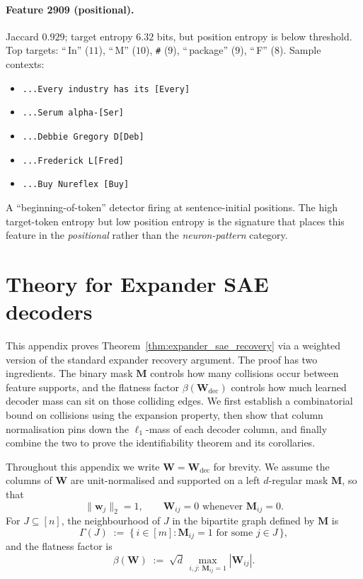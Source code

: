 \documentclass{article}
\theoremstyle{plain}
\theoremstyle{definition}
\theoremstyle{remark}
\begin{document}
\paragraph{Feature 2909 (positional).}
Jaccard $0.929$; target entropy $6.32$ bits, but position entropy is below threshold.
%
Top targets: ``\,In'' ($11$), ``\,M'' ($10$), \texttt{\#} ($9$), ``\,package'' ($9$), ``\,F'' ($8$).
%
Sample contexts:
\begin{itemize}
    \item \texttt{...Every industry has its [Every]}
    \item \texttt{...Serum alpha-[Ser]}
    \item \texttt{...Debbie Gregory D[Deb]}
    \item \texttt{...Frederick L[Fred]}
    \item \texttt{...Buy Nureflex [Buy]}
\end{itemize}
A ``beginning-of-token'' detector firing at sentence-initial positions.
%
The high target-token entropy but low position entropy is the signature that places this feature in the \emph{positional} rather than the \emph{neuron-pattern} category.






\section{Theory for Expander SAE decoders}
\label{app:expander_sae_theory}

This appendix proves Theorem~\ref{thm:expander_sae_recovery} via a weighted version of the standard expander recovery argument. The proof has two ingredients. The binary mask $\mathbf{M}$ controls how many collisions occur between feature supports, and the flatness factor $\beta(\mathbf{W}_{\mathrm{dec}})$ controls how much learned decoder mass can sit on those colliding edges. We first establish a combinatorial bound on collisions using the expansion property, then show that column normalisation pins down the $\ell_1$-mass of each decoder column, and finally combine the two to prove the identifiability theorem and its corollaries.

Throughout this appendix we write $\mathbf{W} = \mathbf{W}_{\mathrm{dec}}$ for brevity. We assume the columns of $\mathbf{W}$ are unit-normalised and supported on a left $d$-regular mask $\mathbf{M}$, so that
\[
    \|\mathbf{w}_j\|_2 = 1,
    \qquad
    \mathbf{W}_{ij} = 0 \text{ whenever } \mathbf{M}_{ij} = 0.
\]
For $J \subseteq [n]$, the neighbourhood of $J$ in the bipartite graph defined by $\mathbf{M}$ is
\[
    \Gamma(J)
    \;:=\;
    \{\,i \in [m] : \mathbf{M}_{ij} = 1 \text{ for some } j \in J\,\},
\]
and the flatness factor is
\[
    \beta(\mathbf{W})
    \;:=\;
    \sqrt{d}\,
    \max_{i,j:\,\mathbf{M}_{ij} = 1}
    |\mathbf{W}_{ij}|.
\]
\end{document}

